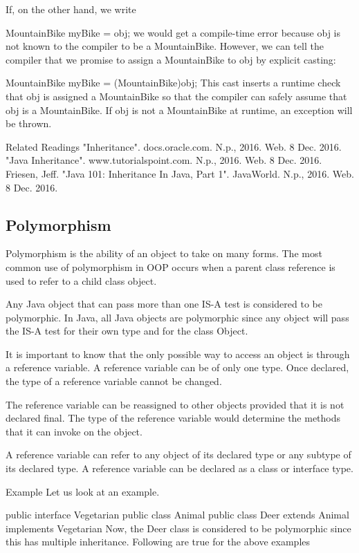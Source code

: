 If, on the other hand, we write

MountainBike myBike = obj;
we would get a compile-time error because obj is not known to the compiler to be a MountainBike. However, we can tell the compiler that we promise to assign a MountainBike to obj by explicit casting:

MountainBike myBike = (MountainBike)obj;
This cast inserts a runtime check that obj is assigned a MountainBike so that the compiler can safely assume that obj is a MountainBike. If obj is not a MountainBike at runtime, an exception will be thrown.

Related Readings
"Inheritance". docs.oracle.com. N.p., 2016. Web. 8 Dec. 2016.
"Java Inheritance". www.tutorialspoint.com. N.p., 2016. Web. 8 Dec. 2016.
Friesen, Jeff. "Java 101: Inheritance In Java, Part 1". JavaWorld. N.p., 2016. Web. 8 Dec. 2016.

\subsection{Polymorphism}

Polymorphism is the ability of an object to take on many forms. The most common use of polymorphism in OOP occurs when a parent class reference is used to refer to a child class object.

Any Java object that can pass more than one IS-A test is considered to be polymorphic. In Java, all Java objects are polymorphic since any object will pass the IS-A test for their own type and for the class Object.

It is important to know that the only possible way to access an object is through a reference variable. A reference variable can be of only one type. Once declared, the type of a reference variable cannot be changed.

The reference variable can be reassigned to other objects provided that it is not declared final. The type of the reference variable would determine the methods that it can invoke on the object.

A reference variable can refer to any object of its declared type or any subtype of its declared type. A reference variable can be declared as a class or interface type.

Example
Let us look at an example.

public interface Vegetarian{}
public class Animal{}
public class Deer extends Animal implements Vegetarian{}
Now, the Deer class is considered to be polymorphic since this has multiple inheritance. Following are true for the above examples

